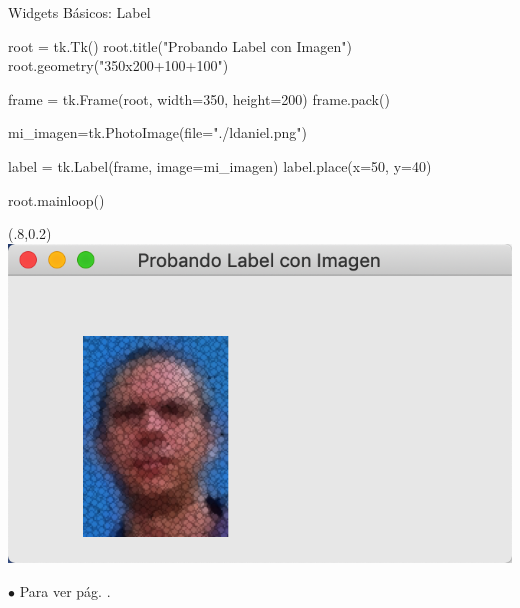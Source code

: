 \documentclass[10pt, envcountsect , spanish]{beamer}
\begin{document}
\begin{frame}[fragile]{Widgets Básicos: Label}
{}

\begin{pyverbatim}[][frame=single]
root = tk.Tk()
root.title("Probando Label con Imagen")
root.geometry("350x200+100+100")


frame = tk.Frame(root, width=350, height=200)
frame.pack()

mi_imagen=tk.PhotoImage(file="./ldaniel.png")

label = tk.Label(frame, image=mi_imagen)
label.place(x=50, y=40)

root.mainloop()
\end{pyverbatim}

\begin{textblock*}{.3\textwidth}(.8\textwidth,0.2\textheight)
\includegraphics[width=\textwidth]{fig/label-con-imagen}
\end{textblock*}


{\scriptsize $\bullet$
Para  ver pág. \pageref{place}.
}
\end{frame}
\end{document}

